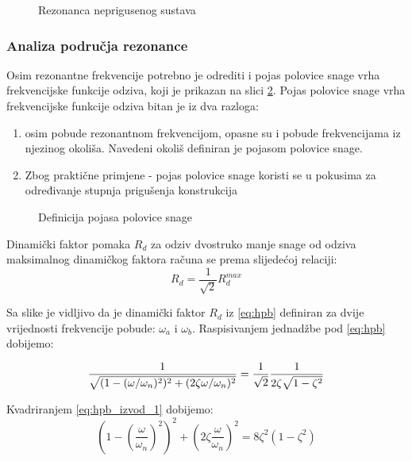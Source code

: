 \begin{figure}[H]
    
    \label{rezonanca-nepriguseno}
    \caption{Rezonanca neprigusenog sustava}
\end{figure}

\subsubsection{Analiza područja rezonance}
Osim rezonantne frekvencije potrebno je odrediti i pojas polovice snage vrha
frekvencijske funkcije odziva, koji je prikazan na slici \ref{fig:hpb}. Pojas polovice
snage vrha frekvencijske funkcije odziva bitan je iz dva razloga:
\begin{enumerate}
    \item osim pobude rezonantnom frekvencijom, opasne su i pobude frekvencijama iz
        njezinog okoliša. Navedeni okoliš definiran je pojasom polovice snage.
    \item Zbog praktične primjene - pojas polovice snage koristi se u pokusima
        za određivanje stupnja prigušenja konstrukcija
\end{enumerate}
\begin{figure}[H]
    
    \caption{Definicija pojasa polovice snage}
    \label{fig:hpb}
\end{figure}
Dinamički faktor pomaka $R_d$ za odziv dvostruko manje snage od odziva maksimalnog
dinamičkog faktora računa se prema slijedećoj relaciji:
\begin{equation}\label{eq:hpb}
    R_d = \frac{1}{\sqrt{2}}R_d^{max}
\end{equation}

Sa slike je vidljivo da je dinamički faktor $R_d$ iz \eqref{eq:hpb} definiran za
dvije vrijednosti frekvencije pobude: $\omega_a$ i $\omega_b$. Raspisivanjem
jednadžbe pod \eqref{eq:hpb} dobijemo:

\begin{equation}\label{eq:hpb_izvod_1}
        \frac{1}{\sqrt{(1-(\omega/\omega_n)^2)^2+(2\zeta\omega/\omega_n)^2}}=
            \frac{1}{\sqrt{2}}\frac{1}{2\zeta\sqrt{1-\zeta^2}}\\
\end{equation}

Kvadriranjem \eqref{eq:hpb_izvod_1} dobijemo:
\begin{equation}\label{eq:hpb_izvod_2}
    \left(1-\left(\frac{\omega}{\omega_n}\right)^2\right)^2
    +\left(2\zeta\frac{\omega}{\omega_n}\right)^2 =
    8\zeta^2(1-\zeta^2)
\end{equation}


